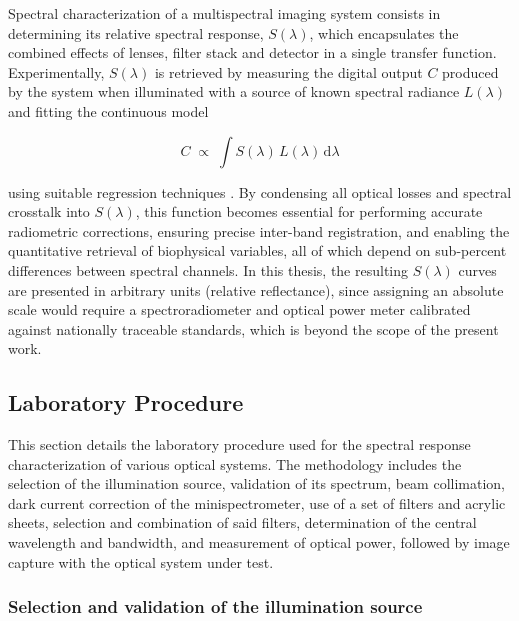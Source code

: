 \noindent Spectral characterization of a multispectral imaging system consists in determining its relative spectral response, $S(\lambda)$, which encapsulates the combined effects of lenses, filter stack and detector in a single transfer function. Experimentally, $S(\lambda)$ is retrieved by measuring the digital output $C$ produced by the system when illuminated with a source of known spectral radiance $L(\lambda)$ and fitting the continuous model

\begin{equation}
    C \;\propto\;\int S(\lambda)\,L(\lambda)\,\mathrm{d}\lambda
\label{eq:spectral_transfer}
\end{equation}

\noindent using suitable regression techniques \cite{Uttner2006SpectralCameras}. By condensing all optical losses and spectral crosstalk into $S(\lambda)$, this function becomes essential for performing accurate radiometric corrections, ensuring precise inter-band registration, and enabling the quantitative retrieval of biophysical variables, all of which depend on sub-percent differences between spectral channels. In this thesis, the resulting $S(\lambda)$ curves are presented in arbitrary units (relative reflectance), since assigning an absolute scale would require a spectroradiometer and optical power meter calibrated against nationally traceable standards, which is beyond the scope of the present work.  


\subsection{Laboratory Procedure}
\label{sec:procedimiento_experimental_laboratorio}

\noindent This section details the laboratory procedure used for the spectral response characterization of various optical systems. The methodology includes the selection of the illumination source, validation of its spectrum, beam collimation, dark current correction of the minispectrometer, use of a set of filters and acrylic sheets, selection and combination of said filters, determination of the central wavelength and bandwidth, and measurement of optical power, followed by image capture with the optical system under test.

\subsubsection{Selection and validation of the illumination source}
\label{subsub:fuente_validacion}

